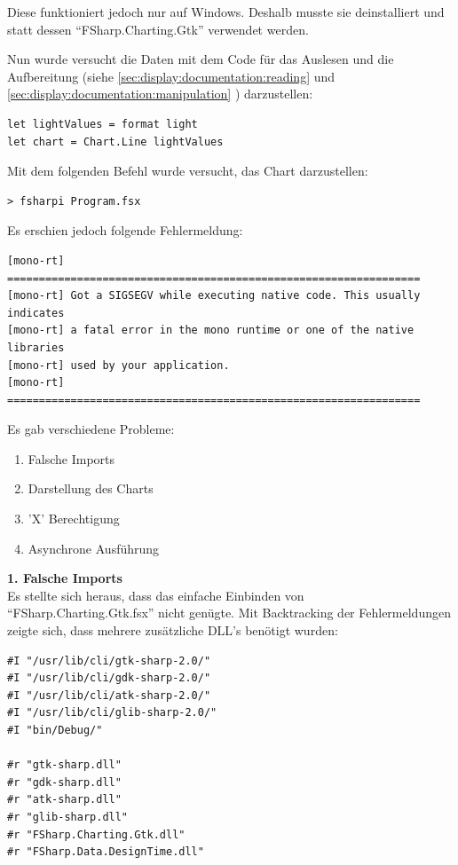 Diese funktioniert jedoch nur auf Windows.
Deshalb musste sie deinstalliert und statt dessen "`FSharp.Charting.Gtk"' verwendet werden.

Nun wurde versucht die Daten mit dem Code für das Auslesen und die Aufbereitung (siehe \cref{sec:display:documentation:reading}  und \cref{sec:display:documentation:manipulation} ) darzustellen:
\begin{lstlisting}
let lightValues = format light
let chart = Chart.Line lightValues
\end{lstlisting}

Mit dem folgenden Befehl wurde versucht, das Chart darzustellen:
\begin{lstlisting}
> fsharpi Program.fsx
\end{lstlisting}

Es erschien jedoch folgende Fehlermeldung:
\begin{lstlisting}
[mono-rt] =================================================================
[mono-rt] Got a SIGSEGV while executing native code. This usually indicates
[mono-rt] a fatal error in the mono runtime or one of the native libraries 
[mono-rt] used by your application.
[mono-rt] =================================================================
\end{lstlisting}

Es gab verschiedene Probleme:
\begin{enumerate}
\item Falsche Imports
\item Darstellung des Charts
\item 'X' Berechtigung
\item Asynchrone Ausführung
\end{enumerate}

\textbf{1. Falsche Imports} \\
Es stellte sich heraus, dass das einfache Einbinden von "`FSharp.Charting.Gtk.fsx"' nicht genügte.
Mit Backtracking der Fehlermeldungen zeigte sich, dass mehrere zusätzliche DLL's benötigt wurden:
\begin{lstlisting}
#I "/usr/lib/cli/gtk-sharp-2.0/"
#I "/usr/lib/cli/gdk-sharp-2.0/"
#I "/usr/lib/cli/atk-sharp-2.0/"
#I "/usr/lib/cli/glib-sharp-2.0/"
#I "bin/Debug/"

#r "gtk-sharp.dll"
#r "gdk-sharp.dll"
#r "atk-sharp.dll"
#r "glib-sharp.dll"
#r "FSharp.Charting.Gtk.dll"
#r "FSharp.Data.DesignTime.dll"
\end{lstlisting}

